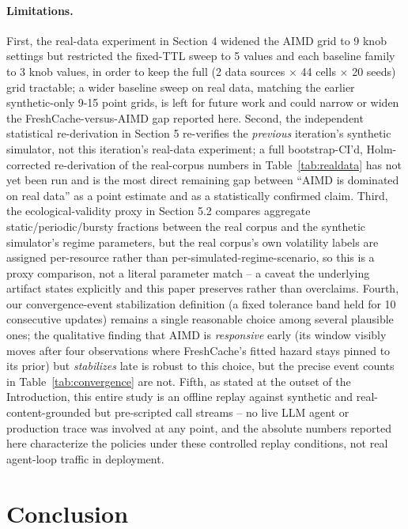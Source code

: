 \documentclass[11pt,letterpaper]{article}
\begin{document}
\paragraph{Limitations.} First, the real-data experiment in Section 4 widened the AIMD grid to 9 knob settings but
restricted the fixed-TTL sweep to 5 values and each baseline family to 3 knob values, in order to keep the
full (2 data sources $\times$ 44 cells $\times$ 20 seeds) grid tractable; a wider baseline sweep on real
data, matching the earlier synthetic-only 9-15 point grids, is left for future work and could narrow or
widen the FreshCache-versus-AIMD gap reported here. Second, the independent statistical re-derivation in
Section 5 re-verifies the \emph{previous} iteration's synthetic simulator, not this iteration's real-data
experiment; a full bootstrap-CI'd, Holm-corrected re-derivation of the real-corpus numbers in Table~\ref{tab:realdata} has
not yet been run and is the most direct remaining gap between ``AIMD is dominated on real data'' as a point
estimate and as a statistically confirmed claim. Third, the ecological-validity proxy in Section 5.2
compares aggregate static/periodic/bursty fractions between the real corpus and the synthetic simulator's
regime parameters, but the real corpus's own volatility labels are assigned per-resource rather than
per-simulated-regime-scenario, so this is a proxy comparison, not a literal parameter match -- a caveat the
underlying artifact states explicitly and this paper preserves rather than overclaims. Fourth, our
convergence-event stabilization definition (a fixed tolerance band held for 10 consecutive updates) remains
a single reasonable choice among several plausible ones; the qualitative finding that AIMD is \emph{responsive}
early (its window visibly moves after four observations where FreshCache's fitted hazard stays pinned to
its prior) but \emph{stabilizes} late is robust to this choice, but the precise event counts in Table~\ref{tab:convergence} are not.
Fifth, as stated at the outset of the Introduction, this entire study is an offline replay against synthetic
and real-content-grounded but pre-scripted call streams -- no live LLM agent or production trace was
involved at any point, and the absolute numbers reported here characterize the policies under these
controlled replay conditions, not real agent-loop traffic in deployment.

\section{Conclusion}
\end{document}
